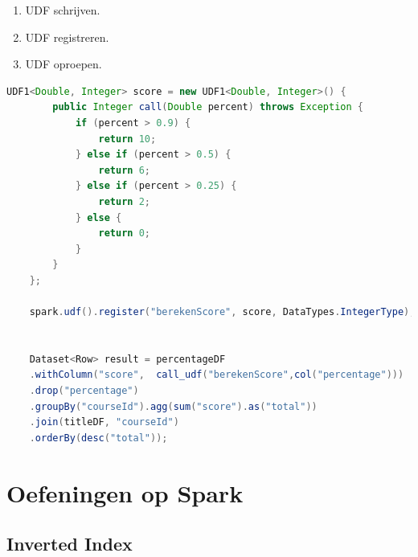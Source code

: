 \documentclass[a4paper,10pt,twoside]{report}
\begin{document}
\begin{enumerate}
	\item UDF schrijven.
	\item UDF registreren.
	\item UDF oproepen.
\end{enumerate}

\begin{lstlisting}[language=Java]
	UDF1<Double, Integer> score = new UDF1<Double, Integer>() {
		public Integer call(Double percent) throws Exception {
			if (percent > 0.9) {
				return 10;
			} else if (percent > 0.5) {
				return 6;
			} else if (percent > 0.25) {
				return 2;
			} else {
				return 0;
			}
		}
	};
	
	spark.udf().register("berekenScore", score, DataTypes.IntegerType);
	
	
	Dataset<Row> result = percentageDF
	.withColumn("score",  call_udf("berekenScore",col("percentage")))
	.drop("percentage")
	.groupBy("courseId").agg(sum("score").as("total"))
	.join(titleDF, "courseId")
	.orderBy(desc("total"));
\end{lstlisting}

\newpage

\section{Oefeningen op Spark}

\subsection{Inverted Index}
\end{document}

